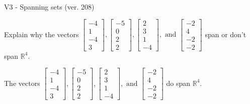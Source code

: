 \begin{exercise}
  \begin{exerciseTitle}V3 - Spanning sets (ver. 208)\end{exerciseTitle}
  \begin{exerciseStatement}
    Explain why the vectors \(\left[\begin{array}{r}
-4 \\
1 \\
-4 \\
3
\end{array}\right] , \left[\begin{array}{r}
-5 \\
0 \\
2 \\
2
\end{array}\right] , \left[\begin{array}{r}
2 \\
3 \\
1 \\
-4
\end{array}\right] , \text{ and } \left[\begin{array}{r}
-2 \\
4 \\
-2 \\
-2
\end{array}\right]\) span or don't span \(\mathbb{R}^4\). 
	


  \end{exerciseStatement}
  \begin{exerciseAnswer}
   The vectors \(\left[\begin{array}{r}
-4 \\
1 \\
-4 \\
3
\end{array}\right] , \left[\begin{array}{r}
-5 \\
0 \\
2 \\
2
\end{array}\right] , \left[\begin{array}{r}
2 \\
3 \\
1 \\
-4
\end{array}\right] , \text{ and } \left[\begin{array}{r}
-2 \\
4 \\
-2 \\
-2
\end{array}\right]\) 
  	 do  
	span \(\mathbb{R}^4\).
  


  \end{exerciseAnswer}
\end{exercise}